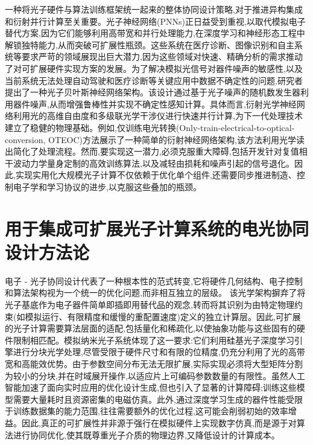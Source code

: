 \documentclass[11pt]{article}
\begin{document}
一种将光子硬件与算法训练框架统一起来的整体协同设计策略,对于推进异构集成和衍射并行计算至关重要。光子神经网络(PNNs)正日益受到重视,以取代模拟电子替代方案,因为它们能够利用高带宽和并行处理能力,在深度学习和神经形态工程中解锁独特能力,从而突破可扩展性瓶颈。这些系统在医疗诊断、图像识别和自主系统等要求严苛的领域展现出巨大潜力,因为这些领域对快速、精确分析的需求推动了对可扩展硬件实现方案的发展。为了解决模拟光信号对器件噪声的敏感性,以及当前系统无法处理自动驾驶和医疗诊断等关键应用中数据不确定性的问题,研究者提出了一种光子贝叶斯神经网络架构。该设计通过基于光子噪声的随机数发生器利用器件噪声,从而增强鲁棒性并实现不确定性感知计算。\citep{doi_10_1002_advs_202500525_74e7146e}具体而言,衍射光学神经网络利用光的高维自由度和多级联光学干涉仪进行快速并行计算,为下一代处理技术建立了稳健的物理基础。例如,仅训练电光转换(Only-train-electrical-to-optical-conversion, OTEOC)方法展示了一种简单的衍射神经网络架构,该方法利用光学读出简化了处理流程。\citep{doi_10_1364_oe_462370_1269b480}然而,要实现这一潜力,必须克服重大障碍,包括开发针对复值相干波动力学量身定制的高效训练算法,以及减轻由损耗和噪声引起的信号退化。因此,实现实用化大规模光子计算不仅依赖于优化单个组件,还需要同步推进制造、控制电子学和学习协议的进步,以克服这些叠加的瓶颈。\citep{doi_10_3390_nano14080697_c372a140} \citep{s2_b765388f3cc18d6e5a0507522822def0e3503ec6_fa09b483}

\section{用于集成可扩展光子计算系统的电光协同设计方法论}\label{ux7528ux4e8eux96c6ux6210ux53efux6269ux5c55ux5149ux5b50ux8ba1ux7b97ux7cfbux7edfux7684ux7535ux5149ux534fux540cux8bbeux8ba1ux65b9ux6cd5ux8bba}

电子 - 光子协同设计代表了一种根本性的范式转变,它将硬件几何结构、电子控制和算法架构视为一个统一的优化问题,而非相互独立的层级。\citep{doi_10_48550_arxiv_2410_01289_34dceec6} \citep{doi_10_1145_3658617_3697771_aa4ee9ae} 该光学架构摒弃了将光子基底作为电子器件简单即插即用替代品的观念,转而将其识别为由特定物理约束(如模拟运行、有限精度和缓慢的重配置速度)定义的独立计算层。因此,可扩展的光子计算需要算法层面的适配,包括量化和稀疏化,以使抽象功能与这些固有的硬件限制相匹配。模拟纳米光子系统体现了这一要求:它们利用硅基光子深度学习引擎进行分块光学处理,尽管受限于硬件尺寸和有限的位精度,仍充分利用了光的高带宽和高能效优势。由于参数空间分布无法无限扩展,实际实现必须将大型矩阵分割为较小的分块,并在时域展开操作,以适应片上可编码参数数量的有限性。虽然人工智能加速了面向实时应用的优化设计生成,但也引入了显著的计算障碍;训练这些模型需要大量耗时且资源密集的电磁仿真。此外,通过深度学习生成的器件性能受限于训练数据集的能力范围,往往需要额外的优化过程,这可能会削弱初始的效率增益。因此,真正的可扩展性并非源于强行在模拟硬件上实现数字仿真,而是源于对算法进行协同优化,使其既尊重光子介质的物理边界,又降低设计的计算成本。\citep{doi_10_1515_nanoph_2024_0536_4b6631ba} \citep{doi_10_1515_nanoph_2022_0423_38a2c3ec}
\end{document}

